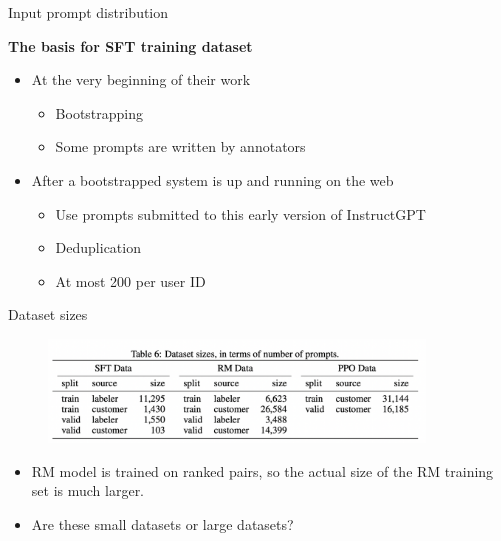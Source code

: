 \begin{vbframe}{Input prompt distribution}

\vfill

\textbf{The basis for SFT training dataset}

	\begin{itemize}
        \item At the very beginning of their work
	\begin{itemize}
        \item Bootstrapping
          \item Some prompts are written
            by annotators
	\end{itemize}
        \item After a bootstrapped system is up and running
        on the web
	\begin{itemize}
	\item Use prompts submitted to this early
          version of InstructGPT
          \item Deduplication
        \item At most 200 per user ID
	\end{itemize}
	\end{itemize}

\vfill

\end{vbframe}

\begin{vbframe}{Dataset sizes}

\vfill

\begin{figure}
\centering
\includegraphics[width = 10cm]{figure/datasetsize.png}
\end{figure}

\begin{itemize}
	\item RM model is trained on ranked pairs, so the
	actual size of the RM training set is much larger.
	\item \ques Are these small datasets or large datasets?
\end{itemize}

\vfill

\end{vbframe}

